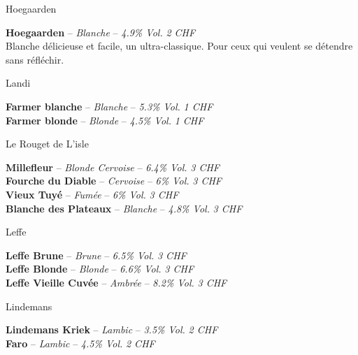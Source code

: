 \documentclass{resume} %
\begin{document}
	\begin{rSection}{Hoegaarden}

	{\bf Hoegaarden} – {\em Blanche } – {\em 4.9\% Vol.} \hfill {\em 2 CHF} \\
	Blanche délicieuse et facile, un ultra-classique. Pour ceux qui veulent se détendre sans réfléchir. \\

	\end{rSection}

	\begin{rSection}{Landi}

	{\bf Farmer blanche} – {\em Blanche } – {\em 5.3\% Vol.} \hfill {\em 1 CHF} \\

	{\bf Farmer blonde} – {\em Blonde } – {\em 4.5\% Vol.} \hfill {\em 1 CHF} \\

	\end{rSection}

	\begin{rSection}{Le Rouget de L'isle}

	{\bf Millefleur} – {\em Blonde Cervoise } – {\em 6.4\% Vol.} \hfill {\em 3 CHF} \\

	{\bf Fourche du Diable} – {\em Cervoise } – {\em 6\% Vol.} \hfill {\em 3 CHF} \\

	{\bf Vieux Tuyé} – {\em Fumée } – {\em 6\% Vol.} \hfill {\em 3 CHF} \\

	{\bf Blanche des Plateaux} – {\em Blanche } – {\em 4.8\% Vol.} \hfill {\em 3 CHF} \\

	\end{rSection}

	\begin{rSection}{Leffe}

	{\bf Leffe Brune} – {\em Brune } – {\em 6.5\% Vol.} \hfill {\em 3 CHF} \\

	{\bf Leffe Blonde} – {\em Blonde } – {\em 6.6\% Vol.} \hfill {\em 3 CHF} \\

	{\bf Leffe Vieille Cuvée} – {\em Ambrée } – {\em 8.2\% Vol.} \hfill {\em 3 CHF} \\

	\end{rSection}

	\begin{rSection}{Lindemans}

	{\bf Lindemans Kriek} – {\em Lambic } – {\em 3.5\% Vol.} \hfill {\em 2 CHF} \\

	{\bf Faro} – {\em Lambic } – {\em 4.5\% Vol.} \hfill {\em 2 CHF} \\

	\end{rSection}
\end{document}
